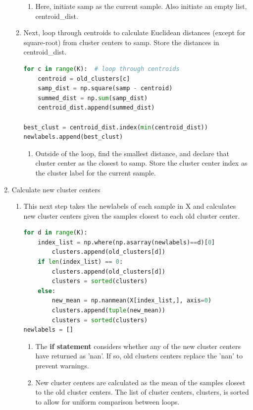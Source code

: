 \documentclass[11pt]{article}
\theoremstyle{definition}
\begin{document}
\begin{enumerate}
\begin{enumerate}
\begin{enumerate}
                \item Here, initiate \textsf{samp} as the current sample. Also initiate an empty list, \textsf{centroid\_dist}.
            \end{enumerate}
        \item Next, loop through \textsf{centroids} to calculate Euclidean distances (except for square-root) from cluster centers to \textsf{samp}. Store the distances in \textsf{centroid\_dist}.
\begin{lstlisting}[language=python, frame=single]
for c in range(K):  # loop through centroids
    centroid = old_clusters[c]
    samp_dist = np.square(samp - centroid)
    summed_dist = np.sum(samp_dist)
    centroid_dist.append(summed_dist)

best_clust = centroid_dist.index(min(centroid_dist))
newlabels.append(best_clust)
\end{lstlisting}
        \begin{enumerate}
            \item Outside of the loop, find the smallest distance, and declare that cluster center as the closest to \textsf{samp}. Store the cluster center index as the cluster label for the current sample. 
        \end{enumerate}
    \end{enumerate}
    \item Calculate new cluster centers
    \begin{enumerate}
        \item This next step takes the \textsf{newlabels} of each sample in \textsf{X} and calculates new cluster centers given the samples closest to each old cluster center.
\begin{lstlisting}[language=python, frame=single]
for d in range(K):
    index_list = np.where(np.asarray(newlabels)==d)[0]
        clusters.append(old_clusters[d])
    if len(index_list) == 0:
        clusters.append(old_clusters[d])
        clusters = sorted(clusters)
    else:   
        new_mean = np.nanmean(X[index_list,], axis=0)
        clusters.append(tuple(new_mean))
        clusters = sorted(clusters)
newlabels = []
\end{lstlisting}
        \begin{enumerate}
            \item The \textbf{if statement} considers whether any of the new cluster centers have returned as 'nan'. If so, old clusters centers replace the 'nan' to prevent warnings.
            \item New cluster centers are calculated as the mean of the samples closest to the old cluster centers. The list of cluster centers, \textsf{clusters}, is sorted to allow for uniform comparison between loops.

\end{enumerate}
\end{enumerate}
\end{enumerate}
\end{document}
